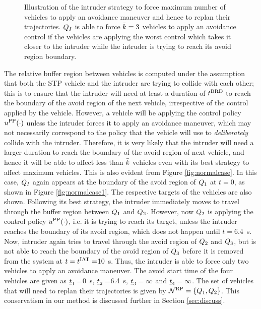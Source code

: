 \begin{figure}
\begin{subfigure}{.5\columnwidth}
  \subcaption{}
  \label{fig:worstcase4}
\end{subfigure}
\caption{Illustration of the intruder strategy to force maximum number of vehicles to apply an avoidance maneuver and hence to replan their trajectories. $Q_{I}$ is able to force $\bar{k}=3$ vehicles to apply an avoidance control if the vehicles are applying the worst control which takes it closer to the intruder while the intruder is trying to reach its avoid region boundary. }
\label{fig:worstcase}
\end{figure}

The relative buffer region between vehicles is computed under the assumption that both the STP vehicle and the intruder are trying to collide with each other; this is to ensure that the intruder will need at least a duration of $t^\text{BRD}$ to reach the boundary of the avoid region of the next vehicle, irrespective of the control applied by the vehicle. However, a vehicle will be applying the control policy $u^{\text{PP}}(\cdot)$ unless the intruder forces it to apply an avoidance maneuver, which may not necessarily correspond to the policy that the vehicle will use to \textit{deliberately} collide with the intruder. Therefore, it is very likely that the intruder will need a larger duration to reach the boundary of the avoid region of next vehicle, and hence it will be able to affect less than $\bar{k}$ vehicles even with its best strategy to affect maximum vehicles. This is also evident from Figure \ref{fig:normalcase}. In this case, $Q_{I}$ again appears at the boundary of the avoid region of $Q_1$ at $t=0$, as shown in Figure \ref{fig:normalcase1}. The respective targets of the vehicles are also shown. Following its best strategy, the intruder immediately moves to travel through the buffer region between $Q_1$ and $Q_2$. However, now $Q_2$ is applying the control policy $u^{\text{PP}}(\cdot)$, i.e. it is trying to reach its target, unless the intruder reaches the boundary of its avoid region, which does not happen until $t= $\SI{6.4}{\s}. Now, intruder again tries to travel through the avoid region of $Q_2$ and $Q_3$, but is not able to reach the boundary of the avoid region of $Q_3$ before it is removed from the system at $t=t^\text{IAT}=$\SI{10}{\s}. Thus, the intruder is able to force only two vehicles to apply an avoidance maneuver. The avoid start time of the four vehicles are given as $\underline{t}_1 = $\SI{0}{\s}, $\underline{t}_2 = $\SI{6.4}{\s}, $\underline{t}_3 = \infty$ and $\underline{t}_4 = \infty$. The set of vehicles that will need to replan their trajectories is given by $\mathcal{N}^\text{RP} = \{Q_1, Q_2\}$. This conservatism in our method is discussed further in Section \ref{sec:discuss}.
